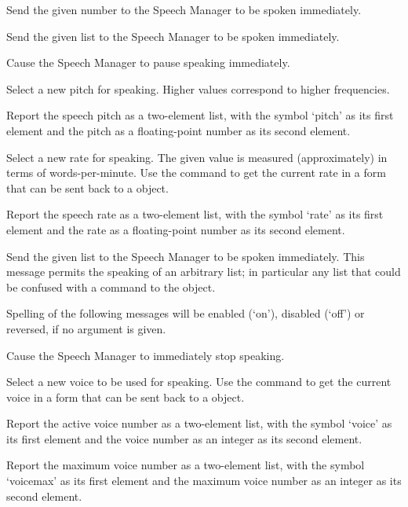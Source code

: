   Send the given number to the Speech Manager to be spoken immediately.
  
  Send the given list to the Speech Manager to be spoken immediately.
  
  Cause the Speech Manager to pause speaking immediately.
  
  Select a new pitch for speaking.
  Higher values correspond to higher frequencies.
  
  Report the speech pitch as a two-element list, with the symbol `pitch' as its first element and
  the pitch as a floating-point number as its second element.
  
  Select a new rate for speaking.
  The given value is measured (approximately) in terms of words-per-minute.
  Use the  command to get the current rate in a form that can be sent back to a
   object.
  
  Report the speech rate as a two-element list, with the symbol `rate' as its first element and
  the rate as a floating-point number as its second element.
 
  Send the given list to the Speech Manager to be spoken immediately.
  This message permits the speaking of an arbitrary list; in particular any list that could be
  confused with a command to the  object.
  
  Spelling of the following messages will be enabled (`on'), disabled (`off') or reversed, if no argument is given.
  
  Cause the Speech Manager to immediately stop speaking.
  
  Select a new voice to be used for speaking.
  Use the  command to get the current voice in a form that can be sent back to a
   object.
  
  Report the active voice number as a two-element list, with the symbol `voice' as its first element and
  the voice number as an integer as its second element.
  
  Report the maximum voice number as a two-element list, with the symbol `voicemax' as its first element and
  the maximum voice number as an integer as its second element.
  
